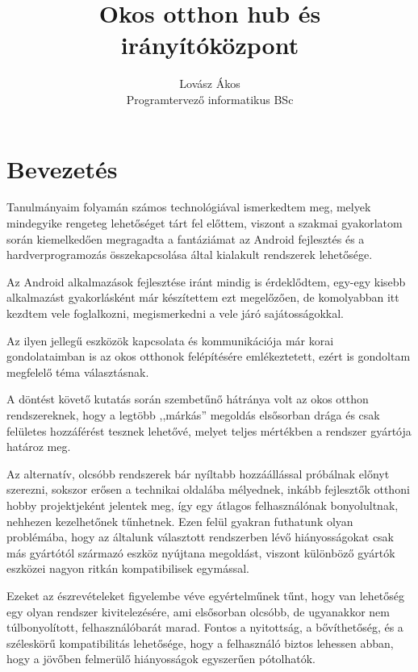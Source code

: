 \documentclass[
]{thesis-ekf}
\theoremstyle{definition}
\theoremstyle{remark}
\begin{document}
\title{Okos otthon hub és irányítóközpont}
\author{Lovász Ákos\\Programtervező informatikus BSc}
\date{\the\year{}}
\maketitle
\tableofcontents


\chapter*{Bevezetés}
Tanulmányaim folyamán számos technológiával ismerkedtem meg, melyek mindegyike rengeteg
lehetőséget tárt fel előttem, viszont a szakmai gyakorlatom során kiemelkedően megragadta a fantáziámat az Android
fejlesztés és a hardverprogramozás összekapcsolása által kialakult rendszerek lehetősége.


Az Android alkalmazások fejlesztése iránt mindig is érdeklődtem, egy-egy kisebb alkalmazást gyakorlásként
már készítettem ezt megelőzően, de komolyabban itt kezdtem vele foglalkozni, megismerkedni a vele járó
sajátosságokkal.


Az ilyen jellegű eszközök kapcsolata és kommunikációja már korai gondolataimban is az okos otthonok felépítésére
emlékeztetett, ezért is gondoltam megfelelő téma választásnak.


A döntést követő kutatás során szembetűnő hátránya volt az okos otthon rendszereknek, hogy a legtöbb ,,márkás''
megoldás elsősorban drága és csak felületes hozzáférést tesznek lehetővé, melyet teljes mértékben a rendszer
gyártója határoz meg. 


Az alternatív, olcsóbb rendszerek bár nyíltabb hozzáállással próbálnak előnyt szerezni,
sokszor erősen a technikai oldalába mélyednek, inkább fejlesztők otthoni hobby projektjeként jelentek meg, 
így egy átlagos felhasználónak bonyolultnak, nehhezen kezelhetőnek tűnhetnek. Ezen felül gyakran futhatunk 
olyan problémába, hogy az általunk választott rendszerben lévő hiányosságokat csak más gyártótól származó 
eszköz nyújtana megoldást, viszont különböző gyártók eszközei nagyon ritkán kompatibilisek egymással.


Ezeket az észrevételeket figyelembe véve egyértelműnek tűnt, hogy van lehetőség egy olyan rendszer kivitelezésére,
ami elsősorban olcsóbb, de ugyanakkor nem túlbonyolított, felhasználóbarát marad. Fontos a nyitottság, a bővíthetőség,
és a széleskörű kompatibilitás lehetősége, hogy a felhasználó biztos lehessen abban, hogy a jövőben felmerülő
hiányosságok egyszerűen pótolhatók.
\end{document}
